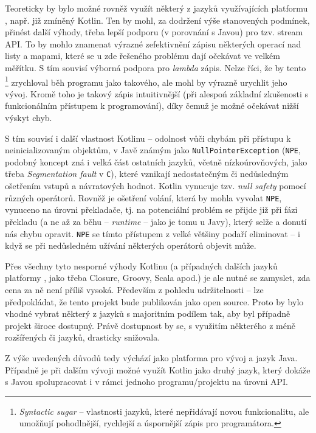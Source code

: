 Teoreticky by bylo možné rovněž využít některý z jazyků využívajících platformu , např. již zmíněný Kotlin. Ten by mohl, za dodržení výše stanovených podmínek, přinést další výhody, třeba lepší podporu (v porovnání s Javou) pro tzv. stream API. To by mohlo znamenat výrazné zefektivnění zápisu některých operací nad listy a mapami, které se u zde řešeného problému dají očekávat ve velkém měřítku. S tím souvisí výborná podpora pro \textit{lambda} zápis. Nelze říci, že by tento \footnote{\textit{Syntactic sugar} -- vlastnosti jazyků, které nepřidávají novou funkcionalitu, ale umožňují pohodlnější, rychlejší a úspornější zápis pro programátora.} zrychloval běh programu jako takového, ale mohl by výrazně urychlit jeho vývoj. Kromě toho je takový zápis intuitivnější (při alespoń základní zkušenosti s funkcionálním přístupem k programování), díky čemuž je možné očekávat nižší výskyt chyb.

S tím souvisí i další vlastnost Kotlinu -- odolnost vůči chybám při přístupu k neinicializovaným objektům, v Javě známým jako \texttt{NullPointerException} (\texttt{NPE}, podobný koncept zná i velká část ostatních jazyků, včetně nízkoúrovňových, jako třeba \textit{Segmentation fault} v \texttt{C}), které vznikají nedostatečným či nedůsledným ošetřením vstupů a návratových hodnot. Kotlin vynucuje tzv. \textit{null safety} pomocí různých operátorů. Rovněž je ošetření volání, která by mohla vyvolat \texttt{NPE}, vynuceno na úrovni překladače, tj. na potenciální problém se přijde již při fázi překladu (a ne až za běhu -- \textit{runtime} -- jako je tomu u Javy), který selže a donutí nás chybu opravit. \texttt{NPE} se tímto přístupem z velké většiny podaří eliminovat -- i když se při nedůsledném užívání některých operátorů objevit může.

Přes všechny tyto nesporné výhody Kotlinu (a případných dalších jazyků platformy , jako třeba Closure, Groovy, Scala apod.) je ale nutné se zamyslet, zda cena za ně není příliš vysoká. Především z pohledu udržitelnosti -- lze předpokládat, že tento projekt bude publikován jako open source. Proto by bylo vhodné vybrat některý z jazyků s majoritním podílem tak, aby byl případně projekt široce dostupný. Právě dostupnost by se, s využitím některého z méně rozšířených či  jazyků, drasticky snižovala.

Z výše uvedených důvodů tedy výchází jako platforma pro vývoj  a jazyk Java. Případně je při dalším vývoji možné využít Kotlin jako druhý jazyk, který dokáže s Javou spolupracovat i v rámci jednoho programu/projektu na úrovni API.

